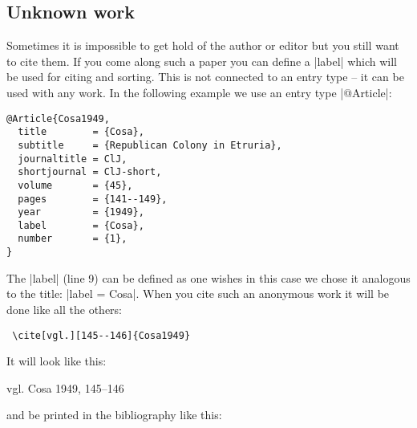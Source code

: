 \documentclass[a4paper,
10pt,
greek,
french,
spanish,
italian,
ngerman,
english
]{ltxdoc}
\begin{document}
\subsection{Unknown work}\label{unbekannt}
Sometimes it is impossible to get hold of the author or editor but you still want to cite them.
If you come along such a paper you can define a |label| which will be used for citing and sorting.
This is not connected to an entry type -- it can be used with any work.
In the following example we use an entry type |@Article|:
\begin{lstlisting}[style=bibentry,label=Cosa1949,caption={{@}Article\{Cosa1949,…\} }]
@Article{Cosa1949,
  title        = {Cosa},
  subtitle     = {Republican Colony in Etruria},
  journaltitle = ClJ,
  shortjournal = ClJ-short,
  volume       = {45},
  pages        = {141--149},
  year         = {1949},
  label        = {Cosa},
  number       = {1},
}
\end{lstlisting}
 The |label| (line 9) can be defined as one wishes in this case we chose it analogous to the title: |label = {Cosa}|.
When you cite such an anonymous work it will be done like all the others:
\begin{lstlisting}
 \cite[vgl.][145--146]{Cosa1949}
\end{lstlisting}
 It will look like this:
 \begin{bsp} 
 vgl. Cosa 1949, 145--146
 \end{bsp}
and be printed in the bibliography like this:
\end{document}
